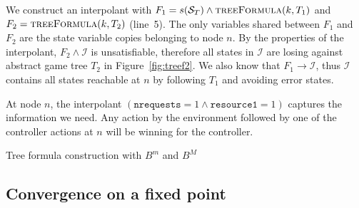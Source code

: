 We construct an interpolant with $F_1 = s(\mathcal{S}_T) \land \textsc{treeFormula}(k, T_1)$ and $F_2 = \textsc{treeFormula}(k, T_2)$ (line~5). The only variables shared between $F_1$ and $F_2$ are the state variable copies belonging to node $n$. By the properties of the interpolant, $F_2 \land \mathcal{I}$ is unsatisfiable, therefore all states in $\mathcal{I}$ are losing against abstract game tree $T_2$ in Figure~\ref{fig:treef2}.  We also know that $F_1 \to \mathcal{I}$, thus $\mathcal{I}$ contains all states reachable at $n$ by following $T_1$ and avoiding error states.  

At node $n$, the interpolant $(\texttt{nrequests} = 1 \land
\texttt{resource1} = 1)$ captures the information we need. Any action by the
environment followed by one of the controller actions at $n$ will be
winning for the controller.

\begin{algorithm}[t] \caption{Tree formula construction with $B^m$ and $B^M$} \label{alg:unboundedTreeFormula} \begin{algorithmic}[1]
          \State
         \Else \State {} \EndIf
        \EndFunction {} \end{algorithmic}

    \begin{algorithmic}[1]
        \State {}
        \Else
        \State {}
        \EndIf
        \EndFunction
    \end{algorithmic}
\end{algorithm}

\subsection{Convergence on a fixed point}

